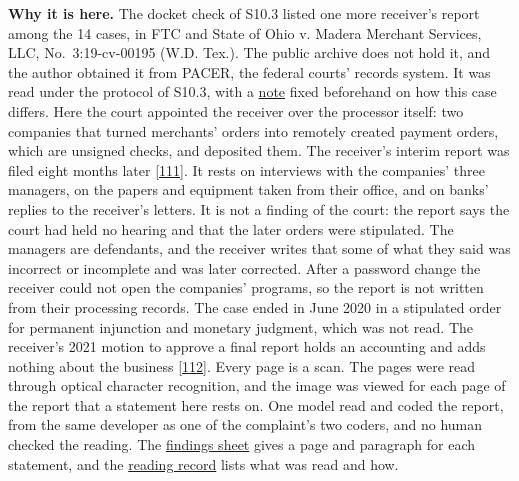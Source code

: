 \documentclass[
  11pt,
]{article}
\begin{document}
\textbf{Why it is here.} The docket check of S10.3 listed one more
receiver's report among the 14 cases, in FTC and State of Ohio v. Madera
Merchant Services, LLC, No.~3:19-cv-00195 (W.D. Tex.). The public
archive does not hold it, and the author obtained it from PACER, the
federal courts' records system. It was read under the protocol of S10.3,
with a \href{tools/receiver_report/madera/README.md}{note} fixed
beforehand on how this case differs. Here the court appointed the
receiver over the processor itself: two companies that turned merchants'
orders into remotely created payment orders, which are unsigned checks,
and deposited them. The receiver's interim report was filed eight months
later {[}\protect\hyperlink{ref-MaderaReceiver2020Report}{111}{]}. It
rests on interviews with the companies' three managers, on the papers
and equipment taken from their office, and on banks' replies to the
receiver's letters. It is not a finding of the court: the report says
the court had held no hearing and that the later orders were stipulated.
The managers are defendants, and the receiver writes that some of what
they said was incorrect or incomplete and was later corrected. After a
password change the receiver could not open the companies' programs, so
the report is not written from their processing records. The case ended
in June 2020 in a stipulated order for permanent injunction and monetary
judgment, which was not read. The receiver's 2021 motion to approve a
final report holds an accounting and adds nothing about the business
{[}\protect\hyperlink{ref-MaderaReceiver2021Final}{112}{]}. Every page
is a scan. The pages were read through optical character recognition,
and the image was viewed for each page of the report that a statement
here rests on. One model read and coded the report, from the same
developer as one of the complaint's two coders, and no human checked the
reading. The \href{tools/receiver_report/madera/FINDINGS.csv}{findings
sheet} gives a page and paragraph for each statement, and the
\href{tools/receiver_report/madera/READING.md}{reading record} lists
what was read and how.
\end{document}
